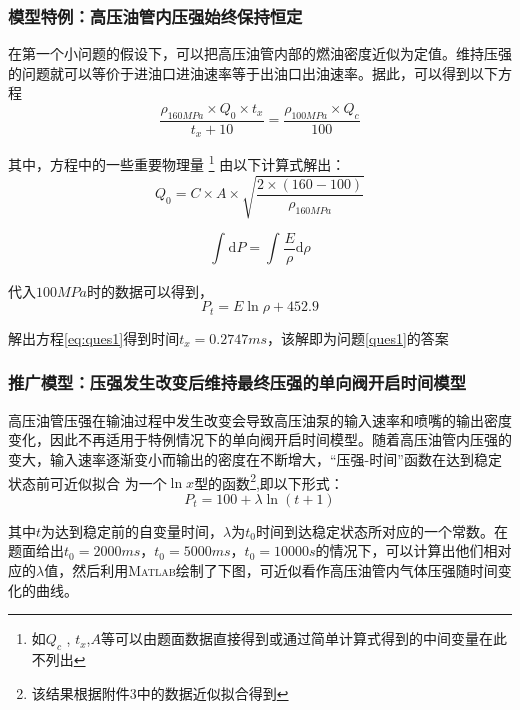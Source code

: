 \documentclass{cumcmthesis}
\begin{document}
\subsubsection{模型特例：高压油管内压强始终保持恒定}\label{case0}
在第一个小问题的假设下，可以把高压油管内部的燃油密度近似为定值。维持压强的问题就可以等价于进油口进油速率等于出油口出油速率。据此，可以得到以下方程
\begin{equation}
	\frac{ \rho_{160MPa}\times Q_{0}\times t_{x}}{t_{x}+10}=\frac{ \rho_{100MPa}\times Q_{c}}{100}\label{eq:ques1}
\end{equation}

其中，方程中的一些重要物理量 \footnote{如$Q_{c}$ , $t_{x}$,$A$等可以由题面数据直接得到或通过简单计算式得到的中间变量在此不列出} 由以下计算式解出：
\begin{equation*}
Q_{0} = C\times A\times \sqrt{\frac{2\times (160-100)}{\rho_{160MPa}}}\label{eq:ques1-1}
\end{equation*}

\begin{equation*}
	\int_{}^{}{\text{d}P} = \int_{}^{} \frac{E}{\rho}{\text{d}\rho}\label{eq:ques1-2}
\end{equation*}

代入$100MPa$时的数据可以得到，
\begin{equation}
P_{t} = E\ln\rho+452.9\label{eq:ques1-3}
\end{equation}



解出方程\cref{eq:ques1}得到时间$t_{x} = 0.2747ms$，该解即为问题\ref{ques1}的答案

\subsubsection{推广模型：压强发生改变后维持最终压强的单向阀开启时间模型}
高压油管压强在输油过程中发生改变会导致高压油泵的输入速率和喷嘴的输出密度变化，因此不再适用于特例情况下的单向阀开启时间模型。随着高压油管内压强的变大，输入速率逐渐变小而输出的密度在不断增大，``压强-时间''函数在达到稳定状态前可近似拟合 为一个$\ln x$型的函数\footnote{该结果根据附件3中的数据近似拟合得到},即以下形式：
\begin{equation}
	P_{t} = 100+\lambda\ln (t+1)\label{eq:ques2}	
\end{equation}

其中$t$为达到稳定前的自变量时间，$\lambda$为$t_{0}$时间到达稳定状态所对应的一个常数。在题面给出$t_{0}=2000ms$，$t_{0}=5000ms$，$t_{0}=10000s$的情况下，可以计算出他们相对应的$\lambda$值，然后利用\textsc{Matlab}绘制了下图，可近似看作高压油管内气体压强随时间变化的曲线。
\end{document}
